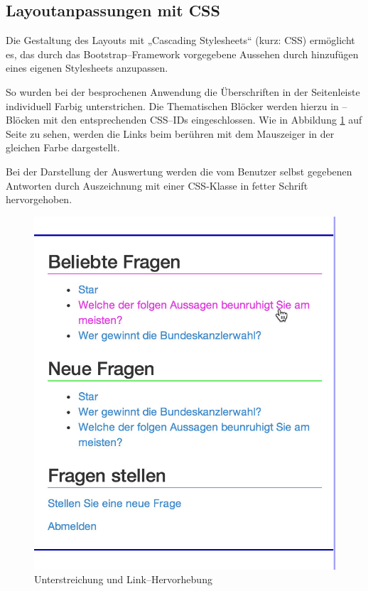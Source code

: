 \subsection{Layoutanpassungen mit CSS}

Die Gestaltung des Layouts mit „Cascading Stylesheets“ (kurz: CSS) ermöglicht es, das durch das Bootstrap--Framework vorgegebene Aussehen durch hinzufügen eines eigenen Stylesheets anzupassen.

So wurden bei der besprochenen Anwendung die Überschriften in der Seitenleiste individuell Farbig unterstrichen. Die Thematischen Blöcker werden hierzu in --Blöcken mit den entsprechenden CSS--IDs eingeschlossen. Wie in Abbildung \ref{fig:seitenleiste} auf Seite \pageref{fig:seitenleiste} zu sehen, werden die Links beim berühren mit dem Mauszeiger in der gleichen Farbe dargestellt.

Bei der Darstellung der Auswertung werden die vom Benutzer selbst gegebenen Antworten durch Auszeichnung mit einer CSS-Klasse in fetter Schrift hervorgehoben. 

\begin{figure}[h]
\begin{center}
\includegraphics[width=\textwidth]{seitenleiste.jpg}
\caption{Unterstreichung und Link--Hervorhebung}
\end{center}
\label{fig:seitenleiste}
\end{figure}



